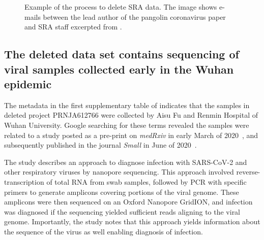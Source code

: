 \documentclass[9pt,twocolumn,twoside]{gsajnl_modified}
\begin{document}
\begin{figure}[]
\centering
{}
\caption{Example of the process to delete SRA data.
The image shows e-mails between the lead author of the pangolin coronavirus paper~\citet{xiao2020isolation} and SRA staff excerpted from \citet{USRTK2020}.
}
\label{fig:pangolin_emails}
\end{figure}

\subsection{The deleted data set contains sequencing of viral samples collected early in the Wuhan epidemic}
The metadata in the first supplementary table of \citet{farkas2020insights} indicates that the samples in deleted project PRNJA612766 were collected by Aisu Fu and Renmin Hospital of Wuhan University.
Google searching for these terms revealed the samples were related to a study posted as a pre-print on \textit{medRxiv} in early March of 2020~\citep{wang2020medRxiv}, and subsequently published in the journal \textit{Small} in June of 2020~\citep{wang2020small}.

The study describes an approach to diagnose infection with SARS-CoV-2 and other respiratory viruses by nanopore sequencing.
This approach involved reverse-transcription of total RNA from swab samples, followed by PCR with specific primers to generate amplicons covering portions of the viral genome.
These amplicons were then sequenced on an Oxford Nanopore GridION, and infection was diagnosed if the sequencing yielded sufficient reads aligning to the viral genome.
Importantly, the study notes that this approach yields information about the sequence of the virus as well enabling diagnosis of infection.
\end{document}

